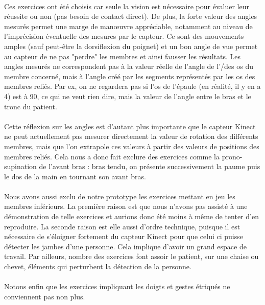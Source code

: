\documentclass[french,12pt]{report}
\begin{document}
\paragraph{}
Ces exercices ont été choisis car seule la vision est nécessaire pour évaluer leur réussite ou non (pas besoin de contact direct).
De plus, la forte valeur des angles mesurés permet une marge de manœuvre appréciable, notamment au niveau de l'imprécision
éventuelle des mesures par le capteur. Ce sont des mouvements amples (sauf peut-être la dorsiflexion du poignet) et un bon
angle de vue permet au capteur de ne pas "perdre" les membres et ainsi fausser les résultats. Les angles mesurés ne
correspondent pas à la valeur réelle de l'angle de l'/des os du membre concerné, mais à l'angle créé par les segments représentés par les os des membres reliés. Par ex, on ne regardera pas si l'os de l'épaule (en réalité, il y en a 4) est à 90\degre, ce qui ne veut rien dire, mais la valeur de l'angle entre le bras et le tronc du patient.

\paragraph{}
Cette réflexion sur les angles est d'autant plus importante que le capteur Kinect ne peut actuellement pas mesurer directement
la valeur de rotation des différents membres, mais que l'on extrapole ces valeurs à partir des valeurs de positions des membres
reliés. Cela nous a donc fait exclure des exercices comme la prono-supination de l'avant bras : bras tendu, on présente successivement la paume puis le dos de la main en tournant son avant bras.

\paragraph{}
Nous avons aussi exclu de notre prototype les exercices mettant en jeu les membres inférieurs. La première raison est que nous n'avons pas assisté à une démonstration de telle exercices et aurions donc été moins à même de tenter d'en reproduire. La 
seconde raison est elle aussi d'ordre technique, puisque il est nécessaire de s'éloigner fortement du capteur Kinect pour que 
celui ci puisse détecter les jambes d'une personne. Cela implique d'avoir un grand espace de travail. Par ailleurs, nombre 
des exercices font assoir le patient, sur une chaise ou chevet, éléments qui perturbent la détection de la personne.

\paragraph{}
Notons enfin que les exercices impliquant les doigts et gestes étriqués ne conviennent pas non plus.
\end{document}

